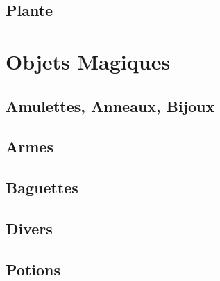 \documentclass{dd}
\begin{document}








\section{Plante}


\chapter{Objets Magiques}

\section{Amulettes, Anneaux, Bijoux} \label{OMbijoux}




\section{Armes} \label{OMarmes}



\section{Baguettes} \label{OMbaguettes}


\section{Divers} \label{OMdivers}




\section{Potions} \label{potions}
\end{document}
